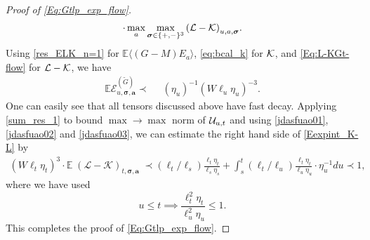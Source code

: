 \documentclass[10pt,reqno]{article}
\theoremstyle{plain} %
\theoremstyle{remark}
\numberwithin{equation}{section}
\begin{document}
\begin{proof}[Proof of \eqref{Eq:Gtlp_exp_flow}]
\begin{align}
 \cdot 
 \max_{\textbf{a}} \max_{ \boldsymbol{\sigma}\in \{+,-\}^3} {({\cal L-\cal K})}_{u,\textbf{a}, \boldsymbol{\sigma} }.
 \end{align}
Using  \eqref{res_ELK_n=1} for $\mathbb E \langle (G-M) E_a\rangle$, \eqref{eq:bcal_k} for $\cal K$, 
and \eqref{Eq:L-KGt-flow} for $\cal L-\cal K$, we have   
 \begin{align} \label{jdasfuao03}
  \mathbb E \mathcal{E}^{(\widetilde{G})}_{u, \boldsymbol{\sigma},\textbf{a}} \prec \; \;& (\eta_u)^{-1} (W\ell_u\eta_u)^{-3}. 
 \end{align}
One can easily see that all tensors discussed above  have  fast decay. Applying \eqref{sum_res_1} to bound  $\max\to \max$ norm of ${\cal U}_{u,t}$ and using   \eqref{jdasfuao01}, \eqref{jdasfuao02} and \eqref{jdasfuao03}, we can estimate the right hand side  of  \eqref{Eexpint_K-L} by 
 \begin{align}
   (W\ell_t\eta_t)^{3}\cdot   \mathbb E\;    (\mathcal{L} - \mathcal{K})_{t, \boldsymbol{\sigma}, \textbf{a}} \;\prec 
 (\ell_t/\ell_s)\frac{\ell_t\eta_t}{\ell_s\eta_s}+
  \int_{s}^t(\ell_t/\ell_u)\frac{\ell_t\eta_t}{\ell_u\eta_u}\cdot \eta_u^{-1}
 du 
 \prec 1, 
\end{align}
where  we have used 
 $$
u\le t\implies\frac{\ell^2_t\eta_t}{\ell^2_u\eta_u}\le 1.
 $$
This  completes the proof of \eqref{Eq:Gtlp_exp_flow}. 
\end{proof}
            
\end{document}
